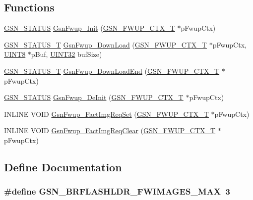 \subsection*{Functions}
\begin{DoxyCompactItemize}
\item 
\hyperlink{a00660_gada5951904ac6110b1fa95e51a9ddc217}{GSN\_\-STATUS} \hyperlink{a00502_ad5b393c828e543e7c8cf471be70bc274}{GsnFwup\_\-Init} (\hyperlink{a00082}{GSN\_\-FWUP\_\-CTX\_\-T} $\ast$pFwupCtx)
\item 
\hyperlink{a00659_gae36517c0f5872426a7034c9551eb96ac}{GSN\_\-STATUS\_\-T} \hyperlink{a00502_a3e80efcb47f67f2dc9ea1bdfeb2f4faf}{GsnFwup\_\-DownLoad} (\hyperlink{a00082}{GSN\_\-FWUP\_\-CTX\_\-T} $\ast$pFwupCtx, \hyperlink{a00660_gab27e9918b538ce9d8ca692479b375b6a}{UINT8} $\ast$pBuf, \hyperlink{a00660_gae1e6edbbc26d6fbc71a90190d0266018}{UINT32} bufSize)
\item 
\hyperlink{a00659_gae36517c0f5872426a7034c9551eb96ac}{GSN\_\-STATUS\_\-T} \hyperlink{a00502_a199d3aab2627e5ad172a2d031c803481}{GsnFwup\_\-DownLoadEnd} (\hyperlink{a00082}{GSN\_\-FWUP\_\-CTX\_\-T} $\ast$pFwupCtx)
\item 
\hyperlink{a00660_gada5951904ac6110b1fa95e51a9ddc217}{GSN\_\-STATUS} \hyperlink{a00502_a6ed82e12e171649fa5bf2a4b3ef19792}{GsnFwup\_\-DeInit} (\hyperlink{a00082}{GSN\_\-FWUP\_\-CTX\_\-T} $\ast$pFwupCtx)
\item 
INLINE VOID \hyperlink{a00502_ab2ca73b8026dce0342defbdaeb8bcb27}{GsnFwup\_\-FactImgReqSet} (\hyperlink{a00082}{GSN\_\-FWUP\_\-CTX\_\-T} $\ast$pFwupCtx)
\item 
INLINE VOID \hyperlink{a00502_a3ca0bc95d324dd38b3d9d653b4dfc250}{GsnFwup\_\-FactImgReqClear} (\hyperlink{a00082}{GSN\_\-FWUP\_\-CTX\_\-T} $\ast$pFwupCtx)
\end{DoxyCompactItemize}


\subsection{Define Documentation}
\hypertarget{a00502_a08715255e49de6b758fc8ff960d04ea9}{
\subsubsection[{GSN\_\-BRFLASHLDR\_\-FWIMAGES\_\-MAX}]{\setlength{\rightskip}{0pt plus 5cm}\#define GSN\_\-BRFLASHLDR\_\-FWIMAGES\_\-MAX~3}}
\label{a00502_a08715255e49de6b758fc8ff960d04ea9}


